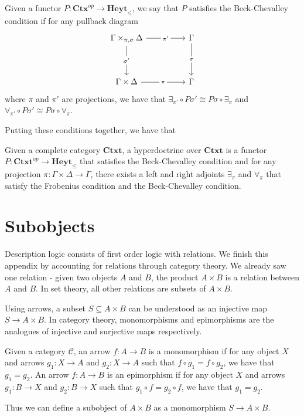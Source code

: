 \begin{definition}
    Given a functor $P:\mathbf{Ctx}^{op}\to\mathbf{Heyt}_{\leq}$,
    we say that $P$ satisfies the Beck-Chevalley condition
    if for any pullback diagram
    \[\begin{tikzcd}
        {\Gamma\times_{\pi,\sigma}\Delta} && {\Gamma} \\
        \\
        {\Gamma\times\Delta} && {\Gamma}
        \arrow["{\pi'}"{description}, from=1-1, to=1-3]
        \arrow["{\pi}"{description}, from=3-1, to=3-3]
        \arrow["{\sigma'}"{description}, from=1-1, to=3-1]
        \arrow["{\sigma}"{description}, from=1-3, to=3-3]
    \end{tikzcd}\]
    where $\pi$ and $\pi'$ are projections,
    we have that $\exists_{\pi'}\circ P\sigma'\cong P\sigma\circ \exists_\pi$
    and $\forall_{\pi'}\circ P\sigma'\cong P\sigma\circ \forall_\pi$.
\end{definition}

Putting these conditions together, we have that
\begin{definition}[Hyperdoctrine]
   Given a complete category $\mathbf{Ctxt}$,
    a hyperdoctrine over $\mathbf{Ctxt}$ is a functor 
    $P:\mathbf{Ctxt}^{op}\to\mathbf{Heyt}_{\leq}$
    that satisfies the Beck-Chevalley condition and
    for any projection $\pi:\Gamma\times\Delta\to\Gamma$,
    there exists a left and right adjoints $\exists_\pi$ and $\forall_\pi$
    that satisfy the Frobenius condition
    and the Beck-Chevalley condition.
\end{definition}

\section{Subobjects}
Description logic consists of first order logic with relations.
We finish this appendix by accounting for relations through category theory.
We already saw one relation - given two objects $A$ and $B$,
the product $A\times B$ is a relation between $A$ and $B$.
In set theory, all other relations are subsets of $A\times B$.

Using arrows, a subset $S\subseteq A\times B$ can be understood as an
injective map $S\to A\times B$.
In category theory, monomorphisms and epimorphisms are the analogues of injective and 
surjective maps respectively.
\begin{definition}
    Given a category $\mathcal{C}$,
    an arrow $f:A\to B$ is a monomorphism if for any object $X$ and arrows $g_1:X\to A$
    and $g_2:X\to A$ such that $f\circ g_1=f\circ g_2$, we have that $g_1=g_2$.
    An arrow $f:A\to B$ is an epimorphism if for any object $X$ and arrows $g_1:B\to X$
    and $g_2:B\to X$ such that $g_1\circ f=g_2\circ f$, we have that $g_1=g_2$.
\end{definition}

Thus we can define a subobject of $A\times B$ as a monomorphism $S\to A\times B$.